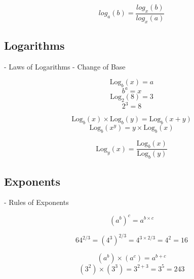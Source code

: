 \documentclass[a4paper,12pt]{article}
\begin{document}
\[ log_a(b) = \frac{log_x(b)}{log_x(a)} \]

\subsection{Logarithms} 
- Laws of Logarithms
- Change of Base

\[ \mbox{Log}_b(x) = a \] \[b^a = x \]
\[ \mbox{Log}_2(8) = 3 \] \[2^3 = 8 \]

\[ \mbox{Log}_b(x) \times \mbox{Log}_b(y) =  \mbox{Log}_b(x+y) \]
\[ \mbox{Log}_b(x^y) =  y \times \mbox{Log}_b(x) \]

\[ \mbox{Log}_y(x)  =  \frac{ \mbox{Log}_b(x) }{ \mbox{Log}_b(y) } \]
\subsection{Exponents}
- Rules of Exponents

\[ (a^b)^c = a^{b \times c}\]

\[ 64^{2/3} =  (4^3)^{2/3} = 4^{3\times2/3} = 4^2 = 16 \]


\[ (a^b) \times (a^c) = a^{b+c}\]
\[ (3^2) \times (3^3) = 3^{2+3} = 3^5  =243 \]
\end{document}

